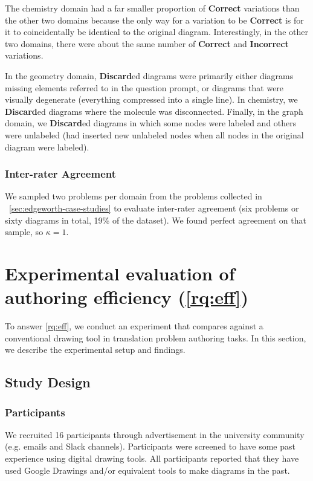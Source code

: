 The chemistry domain had a far smaller proportion of \textbf{Correct} variations than the other two domains because the only way for a variation to be \textbf{Correct} is for it to coincidentally be identical to the original diagram. Interestingly, in the other two domains, there were about the same number of \textbf{Correct} and \textbf{Incorrect} variations.

In the geometry domain, \textbf{Discard}ed diagrams were primarily either diagrams missing elements referred to in the question prompt, or diagrams that were visually degenerate (\eg everything compressed into a single line). In chemistry, we \textbf{Discard}ed diagrams where the molecule was disconnected. Finally, in the graph domain, we \textbf{Discard}ed diagrams in which some nodes were labeled and others were unlabeled (\ie \Edgeworth had inserted new unlabeled nodes when all nodes in the original diagram were labeled).

\subsubsection{Inter-rater Agreement}

We sampled two problems per domain from the problems collected in ~\cref{sec:edgeworth-case-studies} to evaluate inter-rater agreement (six problems or sixty diagrams in total, 19\% of the dataset). We found perfect agreement on that sample, so $\kappa = 1$.

\section{Experimental evaluation of authoring efficiency (\ref{rq:eff})}
\label{sec:edgeworth-user-study}

To answer \ref{rq:eff}, we conduct an experiment that compares \Edgeworth against a conventional drawing tool in translation problem authoring tasks. In this section, we describe the experimental setup and findings.

\subsection{Study Design}

\subsubsection{Participants}

We recruited 16 participants through advertisement in the university community (e.g. emails and Slack channels). Participants were screened to have some past experience using digital drawing tools. All participants reported that they have used Google Drawings and/or equivalent tools to make diagrams in the past.

